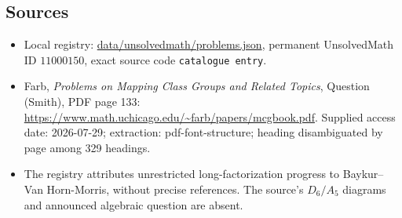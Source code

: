 \documentclass[11pt]{article}
\begin{document}
\subsection{Sources}
\begin{itemize}
\item Local registry: \url{data/unsolvedmath/problems.json}, permanent UnsolvedMath ID $11000150$, exact source code \texttt{catalogue entry}.
\item Farb, \emph{Problems on Mapping Class Groups and Related Topics}, Question (Smith), PDF page 133: \url{https://www.math.uchicago.edu/~farb/papers/mcgbook.pdf}. Supplied access date: 2026-07-29; extraction: pdf-font-structure; heading disambiguated by page among 329 headings.
\item The registry attributes unrestricted long-factorization progress to Baykur--Van Horn-Morris, without precise references. The source's $D_6/A_5$ diagrams and announced algebraic question are absent.
\end{itemize}
\end{document}
